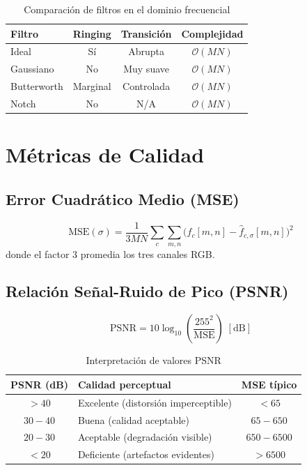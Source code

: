 \documentclass[conference]{IEEEtran}
\begin{document}
\begin{table}[H]
  \centering
  \caption{Comparación de filtros en el dominio frecuencial}
  \label{tab:filtros_comp}
  \begin{tabular}{lccc}
    \toprule
    \textbf{Filtro} & \textbf{Ringing} & \textbf{Transición} & \textbf{Complejidad} \\
    \midrule
    Ideal       & Sí       & Abrupta    & $\mathcal{O}(MN)$ \\
    Gaussiano   & No       & Muy suave  & $\mathcal{O}(MN)$ \\
    Butterworth & Marginal & Controlada & $\mathcal{O}(MN)$ \\
    Notch       & No       & N/A        & $\mathcal{O}(MN)$ \\
    \bottomrule
  \end{tabular}
\end{table}

\section{Métricas de Calidad}
\label{sec:metricas}

\subsection{Error Cuadrático Medio (MSE)}

\begin{equation}
  \mathrm{MSE}(\sigma) = \frac{1}{3MN}\sum_{c}\sum_{m,n}
                          \bigl(f_c[m,n] - \hat{f}_{c,\sigma}[m,n]\bigr)^2
  \label{eq:mse}
\end{equation}
donde el factor $3$ promedia los tres canales RGB.

\subsection{Relación Señal-Ruido de Pico (PSNR)}

\begin{equation}
  \mathrm{PSNR} = 10\log_{10}\!\left(\frac{255^2}{\mathrm{MSE}}\right) \; [\mathrm{dB}]
  \label{eq:psnr}
\end{equation}

\begin{table}[H]
  \centering
  \caption{Interpretación de valores PSNR}
  \label{tab:psnr_referencia}
  \begin{tabular}{clc}
    \toprule
    \textbf{PSNR (dB)} & \textbf{Calidad perceptual} & \textbf{MSE típico} \\
    \midrule
    $> 40$    & Excelente (distorsión imperceptible) & $< 65$     \\
    $30 - 40$ & Buena (calidad aceptable)            & $65-650$   \\
    $20 - 30$ & Aceptable (degradación visible)      & $650-6500$ \\
    $< 20$    & Deficiente (artefactos evidentes)    & $> 6500$   \\
    \bottomrule
  \end{tabular}
\end{table}
\end{document}

